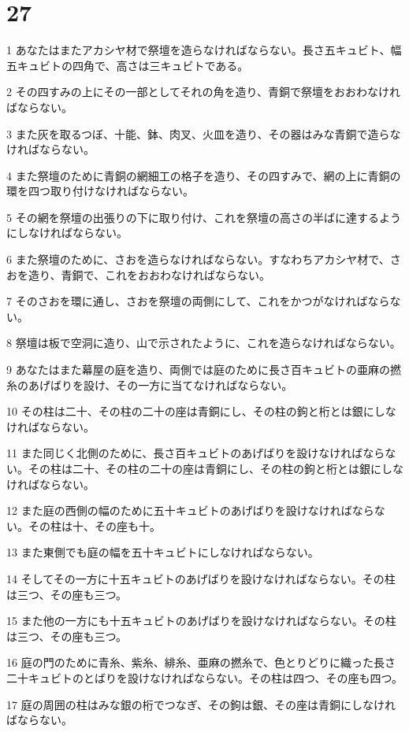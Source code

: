 \chapter{27}

\par 1 あなたはまたアカシヤ材で祭壇を造らなければならない。長さ五キュビト、幅五キュビトの四角で、高さは三キュビトである。
\par 2 その四すみの上にその一部としてそれの角を造り、青銅で祭壇をおおわなければならない。
\par 3 また灰を取るつぼ、十能、鉢、肉叉、火皿を造り、その器はみな青銅で造らなければならない。
\par 4 また祭壇のために青銅の網細工の格子を造り、その四すみで、網の上に青銅の環を四つ取り付けなければならない。
\par 5 その網を祭壇の出張りの下に取り付け、これを祭壇の高さの半ばに達するようにしなければならない。
\par 6 また祭壇のために、さおを造らなければならない。すなわちアカシヤ材で、さおを造り、青銅で、これをおおわなければならない。
\par 7 そのさおを環に通し、さおを祭壇の両側にして、これをかつがなければならない。
\par 8 祭壇は板で空洞に造り、山で示されたように、これを造らなければならない。
\par 9 あなたはまた幕屋の庭を造り、両側では庭のために長さ百キュビトの亜麻の撚糸のあげばりを設け、その一方に当てなければならない。
\par 10 その柱は二十、その柱の二十の座は青銅にし、その柱の鉤と桁とは銀にしなければならない。
\par 11 また同じく北側のために、長さ百キュビトのあげばりを設けなければならない。その柱は二十、その柱の二十の座は青銅にし、その柱の鉤と桁とは銀にしなければならない。
\par 12 また庭の西側の幅のために五十キュビトのあげばりを設けなければならない。その柱は十、その座も十。
\par 13 また東側でも庭の幅を五十キュビトにしなければならない。
\par 14 そしてその一方に十五キュビトのあげばりを設けなければならない。その柱は三つ、その座も三つ。
\par 15 また他の一方にも十五キュビトのあげばりを設けなければならない。その柱は三つ、その座も三つ。
\par 16 庭の門のために青糸、紫糸、緋糸、亜麻の撚糸で、色とりどりに織った長さ二十キュビトのとばりを設けなければならない。その柱は四つ、その座も四つ。
\par 17 庭の周囲の柱はみな銀の桁でつなぎ、その鉤は銀、その座は青銅にしなければならない。

